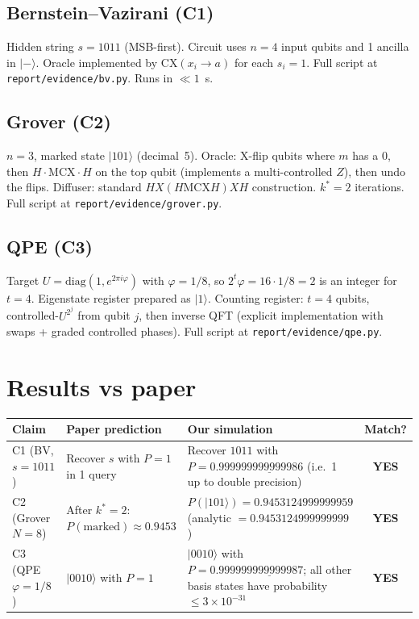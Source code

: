 \documentclass[11pt]{article}
\begin{document}
\subsection{Bernstein--Vazirani (C1)}
Hidden string $s = 1011$ (MSB-first). Circuit uses $n{=}4$ input
qubits and 1 ancilla in $|-\rangle$. Oracle implemented by
$\text{CX}(x_i \to a)$ for each $s_i=1$. Full script at
\texttt{report/evidence/bv.py}. Runs in $\ll1$~s.

\subsection{Grover (C2)}
$n{=}3$, marked state $|101\rangle$ (decimal~5). Oracle:
X-flip qubits where $m$ has a 0, then $H \cdot \text{MCX} \cdot H$
on the top qubit (implements a multi-controlled $Z$), then undo
the flips. Diffuser: standard $H X (H\text{MCX}H) X H$
construction. $k^*=2$ iterations. Full script at
\texttt{report/evidence/grover.py}.

\subsection{QPE (C3)}
Target $U=\text{diag}(1,e^{2\pi i\varphi})$ with $\varphi=1/8$,
so $2^t\varphi = 16\cdot1/8 = 2$ is an integer for $t=4$.
Eigenstate register prepared as $|1\rangle$. Counting register:
$t=4$ qubits, controlled-$U^{2^j}$ from qubit $j$, then inverse
QFT (explicit implementation with swaps + graded controlled
phases). Full script at \texttt{report/evidence/qpe.py}.

\section{Results vs paper}
\label{sec:results}
\begin{longtable}{@{}p{2.5cm}p{4.5cm}p{4.5cm}c@{}}
\toprule
Claim & Paper prediction & Our simulation & Match? \\
\midrule
C1 (BV, $s{=}1011$) & Recover $s$ with $P=1$ in 1 query & Recover
$1011$ with $P=0.9999\underline{9999999998}6$ (i.e.\ 1 up to
double precision) & \textbf{YES} \\
C2 (Grover $N{=}8$) & After $k^*=2$: $P(\text{marked})\approx
0.9453$ & $P(|101\rangle)=0.9453124999999959$ (analytic
$=0.9453124999999999$) & \textbf{YES} \\
C3 (QPE $\varphi{=}1/8$) & $|0010\rangle$ with $P=1$ & $|0010\rangle$
with $P=0.9999\underline{9999999998}7$; all other basis states
have probability $\le 3\times10^{-31}$ & \textbf{YES} \\
\bottomrule
\end{longtable}
\end{document}
